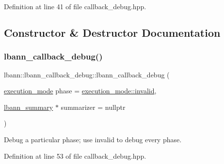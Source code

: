 Definition at line 41 of file callback\+\_\+debug.\+hpp.



\subsection{Constructor \& Destructor Documentation}
\mbox{\label{classlbann_1_1lbann__callback__debug_a775f2f407573526795a9b7ffc7bd3ded}} 
\subsubsection{\texorpdfstring{lbann\+\_\+callback\+\_\+debug()}{lbann\_callback\_debug()}\hspace{0.1cm}{\footnotesize\ttfamily [1/2]}}
{\footnotesize\ttfamily lbann\+::lbann\+\_\+callback\+\_\+debug\+::lbann\+\_\+callback\+\_\+debug (\begin{DoxyParamCaption}\item[{\hyperlink{base_8hpp_a2781a159088df64ed7d47cc91c4dc0a8}{execution\+\_\+mode}}]{phase = {\ttfamily \hyperlink{base_8hpp_a2781a159088df64ed7d47cc91c4dc0a8afedb2d84cafe20862cb4399751a8a7e3}{execution\+\_\+mode\+::invalid}},  }\item[{\hyperlink{classlbann_1_1lbann__summary}{lbann\+\_\+summary} $\ast$}]{summarizer = {\ttfamily nullptr} }\end{DoxyParamCaption})\hspace{0.3cm}{\ttfamily [inline]}}

Debug a particular phase; use invalid to debug every phase. 

Definition at line 53 of file callback\+\_\+debug.\+hpp.


